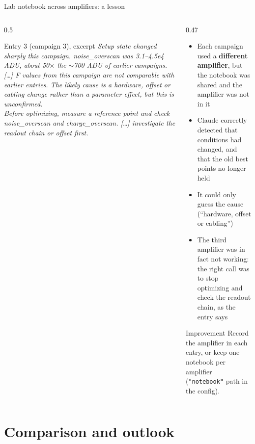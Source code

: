\documentclass[aspectratio=169,10pt]{beamer}
\begin{document}
\begin{frame}{Lab notebook across amplifiers: a lesson}
  \begin{columns}[T]
    \begin{column}{0.5\textwidth}
      \scriptsize
      \begin{block}{Entry 3 (campaign 3), excerpt}
        \emph{Setup state changed sharply this campaign. noise\_overscan was 3.1--4.5e4 ADU,
        about 50$\times$ the $\sim$700 ADU of earlier campaigns. [\dots] F values from this
        campaign are not comparable with earlier entries. The likely cause is a hardware,
        offset or cabling change rather than a parameter effect, but this is unconfirmed.}\\[1mm]
        \emph{Before optimizing, measure a reference point and check noise\_overscan and
        charge\_overscan. [\dots] investigate the readout chain or offset first.}
      \end{block}
    \end{column}
    \begin{column}{0.47\textwidth}
      \small
      \begin{itemize}
        \item Each campaign used a \textbf{different amplifier}, but the notebook was
              shared and the amplifier was not in it
        \item Claude correctly detected that conditions had changed, and that the
              old best points no longer held
        \item It could only guess the cause (``hardware, offset or cabling'')
        \item The third amplifier was in fact not working: the right call was to stop
              optimizing and check the readout chain, as the entry says
      \end{itemize}
      \vspace{1mm}
      \begin{block}{Improvement}
        \scriptsize Record the amplifier in each entry, or keep one notebook per
        amplifier (\texttt{"notebook"} path in the config).
      \end{block}
    \end{column}
  \end{columns}
\end{frame}

\section{Comparison and outlook}
\end{document}
